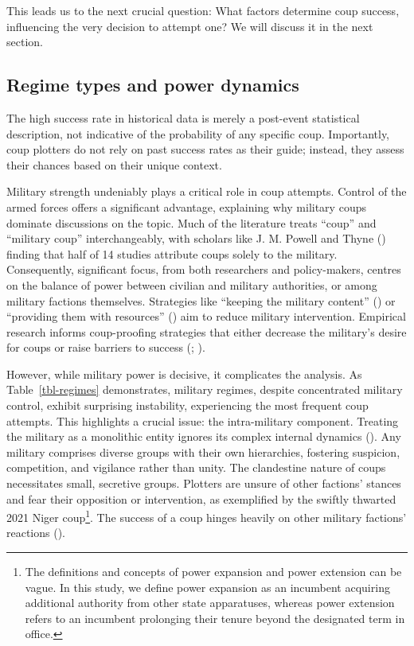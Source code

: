 \documentclass[
  12pt,
]{report}
\begin{document}
This leads us to the next crucial question: What factors determine coup
success, influencing the very decision to attempt one? We will discuss
it in the next section.

\subsection{Regime types and power
dynamics}\label{regime-types-and-power-dynamics}

The high success rate in historical data is merely a post-event
statistical description, not indicative of the probability of any
specific coup. Importantly, coup plotters do not rely on past success
rates as their guide; instead, they assess their chances based on their
unique context.

Military strength undeniably plays a critical role in coup attempts.
Control of the armed forces offers a significant advantage, explaining
why military coups dominate discussions on the topic. Much of the
literature treats ``coup'' and ``military coup'' interchangeably, with
scholars like J. M. Powell and Thyne ()
finding that half of 14 studies attribute coups solely to the military.
Consequently, significant focus, from both researchers and
policy-makers, centres on the balance of power between civilian and
military authorities, or among military factions themselves. Strategies
like ``keeping the military content'' () or ``providing them with resources''
() aim to
reduce military intervention. Empirical research informs coup-proofing
strategies that either decrease the military's desire for coups or raise
barriers to success (;
).

However, while military power is decisive, it complicates the analysis.
As Table~\ref{tbl-regimes} demonstrates, military regimes, despite
concentrated military control, exhibit surprising instability,
experiencing the most frequent coup attempts. This highlights a crucial
issue: the intra-military component. Treating the military as a
monolithic entity ignores its complex internal dynamics
(). Any military comprises diverse
groups with their own hierarchies, fostering suspicion, competition, and
vigilance rather than unity. The clandestine nature of coups
necessitates small, secretive groups. Plotters are unsure of other
factions' stances and fear their opposition or intervention, as
exemplified by the swiftly thwarted 2021 Niger coup\footnote{The
  definitions and concepts of power expansion and power extension can be
  vague. In this study, we define power expansion as an incumbent
  acquiring additional authority from other state apparatuses, whereas
  power extension refers to an incumbent prolonging their tenure beyond
  the designated term in office.}. The success of a coup hinges heavily
on other military factions' reactions ().
\end{document}
